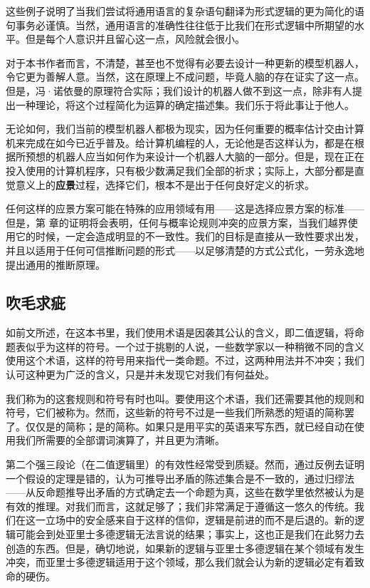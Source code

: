 这些例子说明了当我们尝试将通用语言的复杂语句翻译为形式逻辑的更为简化的语句事务必谨慎。当然，通用语言的准确性往往低于比我们在形式逻辑中所期望的水平。但是每个人意识并且留心这一点，风险就会很小。

对于本书作者而言，不清楚，甚至也不觉得有必要去设计一种更新的模型机器人，令它更为善解人意。当然，这在原理上不成问题，毕竟人脑的存在证实了这一点。但是，冯·诺依曼的原理符合实际；我们设计的机器人做不到这一点，除非有人提出一种理论，将这个过程简化为运算的确定描述集。我们乐于将此事让于他人。

无论如何，我们当前的模型机器人都极为现实，因为任何重要的概率估计交由计算机来完成在如今已近乎普及。给计算机编程的人，无论他是否这样认为，都是在根据所预想的机器人应当如何作为来设计一个机器人大脑的一部分。但是，现在正在投入使用的计算机程序，只有极少数满足我们全部的祈求；实际上，大部分都是直觉意义上的{\bf 应景}过程，选择它们，根本不是出于任何良好定义的祈求。

任何这样的应景方案可能在特殊的应用领域有用——这是选择应景方案的标准——但是，第  章的证明将会表明，任何与概率论规则冲突的应景方案，当我们越界使用它的时候，一定会造成明显的不一致性。我们的目标是直接从一致性要求出发，并且以适用于任何可信推断问题的形式——以足够清楚的方式公式化，一劳永逸地提出通用的推断原理。

\subsection{吹毛求疵}

如前文所述，在这本书里，我们使用术语是因袭其公认的含义，即二值逻辑，将命题表似乎为这样的符号。一个过于挑剔的人说，一些数学家以一种稍微不同的含义使用这个术语，这样的符号用来指代一类命题。不过，这两种用法并不冲突；我们认可这种更为广泛的含义，只是并未发现它对我们有何益处。

我们称为的这套规则和符号有时也叫。要使用这个术语，我们还需要其他的规则和符号，它们被称为。然而，这些新的符号不过是一些我们所熟悉的短语的简称罢了。仅仅是的简称；是的简称。如果只是用平实的英语来写东西，就已经自动在使用我们所需要的全部谓词演算了，并且更为清晰。

第二个强三段论（在二值逻辑里）的有效性经常受到质疑。然而，通过反例去证明一个假设的定理是错的，认为可推导出矛盾的陈述集合是不一致的，通过归缪法——从反命题推导出矛盾的方式确定去一个命题为真，这些在数学里依然被认为是有效的推理。对我们而言，这就足够了；我们非常满足于遵循这一悠久的传统。我们在这一立场中的安全感来自于这样的信仰，逻辑是前进的而不是后退的。新的逻辑可能会到处亚里士多德逻辑无法言说的结果；事实上，这也正是我们在此努力去创造的东西。但是，确切地说，如果新的逻辑与亚里士多德逻辑在某个领域有发生冲突，而亚里士多德逻辑适用于这个领域，那么我们就会认为新的逻辑必定有着致命的硬伤。

